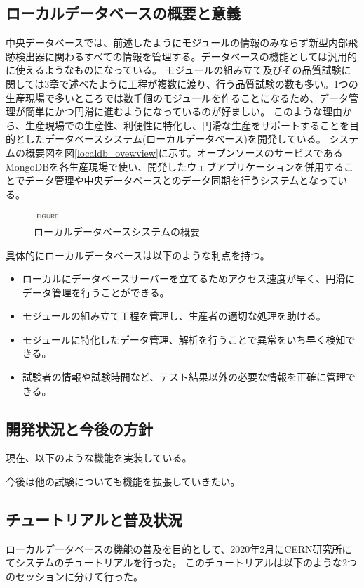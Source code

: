 \subsection{ローカルデータベースの概要と意義}
中央データベースでは、前述したようにモジュールの情報のみならず新型内部飛跡検出器に関わるすべての情報を管理する。データベースの機能としては汎用的に使えるようなものになっている。
モジュールの組み立て及びその品質試験に関しては3章で述べたように工程が複数に渡り、行う品質試験の数も多い。1つの生産現場で多いところでは数千個のモジュールを作ることになるため、データ管理が簡単にかつ円滑に進むようになっているのが好ましい。
このような理由から、生産現場での生産性、利便性に特化し、円滑な生産をサポートすることを目的としたデータベースシステム(ローカルデータベース)を開発している。
システムの概要図を図\ref{localdb_ovewview}に示す。オープンソースのサービスであるMongoDBを各生産現場で使い、開発したウェブアプリケーションを併用することでデータ管理や中央データベースとのデータ同期を行うシステムとなっている。

\begin{figure}[bpt]\centering
\includegraphics[width=1cm]{figure}
\caption[ローカルデータベースシステムの概要]{ローカルデータベースシステムの概要}
\label{localdb_overview}
\end{figure}

具体的にローカルデータベースは以下のような利点を持つ。

\begin{itemize}
  \item ローカルにデータベースサーバーを立てるためアクセス速度が早く、円滑にデータ管理を行うことができる。
  \item モジュールの組み立て工程を管理し、生産者の適切な処理を助ける。
  \item モジュールに特化したデータ管理、解析を行うことで異常をいち早く検知できる。
  \item 試験者の情報や試験時間など、テスト結果以外の必要な情報を正確に管理できる。
\end{itemize}

\subsection{開発状況と今後の方針}
現在、以下のような機能を実装している。

今後は他の試験についても機能を拡張していきたい。

\subsection{チュートリアルと普及状況}
ローカルデータベースの機能の普及を目的として、2020年2月にCERN研究所にてシステムのチュートリアルを行った。
このチュートリアルは以下のような2つのセッションに分けて行った。

